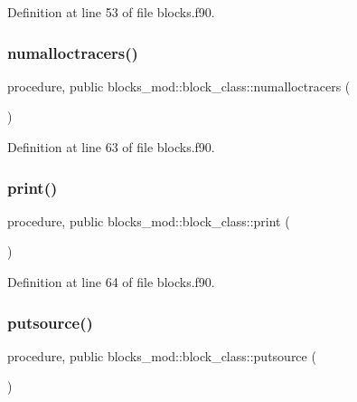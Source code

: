 Definition at line 53 of file blocks.\+f90.

\mbox{\label{structblocks__mod_1_1block__class_a7a3f2eb6823a683a6aaa2159b50ee990}} 
\subsubsection{\texorpdfstring{numalloctracers()}{numalloctracers()}}
{\footnotesize\ttfamily procedure, public blocks\+\_\+mod\+::block\+\_\+class\+::numalloctracers (\begin{DoxyParamCaption}{ }\end{DoxyParamCaption})}



Definition at line 63 of file blocks.\+f90.

\mbox{\label{structblocks__mod_1_1block__class_a43b4c133934eaadb55d30cf834d1e28c}} 
\subsubsection{\texorpdfstring{print()}{print()}}
{\footnotesize\ttfamily procedure, public blocks\+\_\+mod\+::block\+\_\+class\+::print (\begin{DoxyParamCaption}{ }\end{DoxyParamCaption})}



Definition at line 64 of file blocks.\+f90.

\mbox{\label{structblocks__mod_1_1block__class_ac79980e841902691a06212dce50f6331}} 
\subsubsection{\texorpdfstring{putsource()}{putsource()}}
{\footnotesize\ttfamily procedure, public blocks\+\_\+mod\+::block\+\_\+class\+::putsource (\begin{DoxyParamCaption}{ }\end{DoxyParamCaption})}



